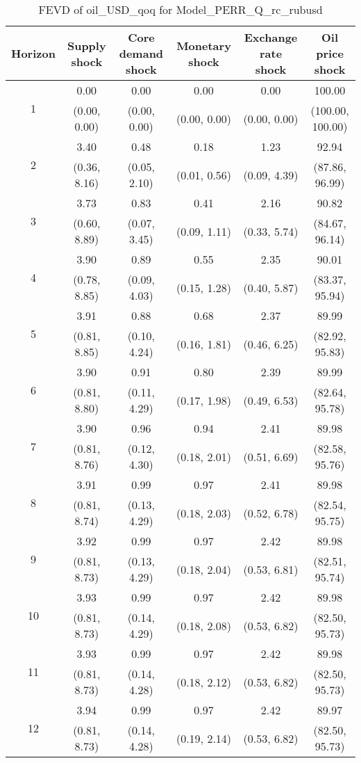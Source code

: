 \documentclass{article}
\begin{document}
\begin{table}
	\footnotesize
	\caption{FEVD of oil_USD_qoq for Model_PERR_Q_rc_rubusd}
	\begin{tabular}{cccccc}
		Horizon & Supply shock & Core demand shock & Monetary shock & Exchange rate shock & Oil price shock\\ \hline
		\multirow{2}{*}{1} & 0.00 & 0.00 & 0.00 & 0.00 & 100.00\\
		 & (0.00, 0.00) & (0.00, 0.00) & (0.00, 0.00) & (0.00, 0.00) & (100.00, 100.00)\\
		\multirow{2}{*}{2} & 3.40 & 0.48 & 0.18 & 1.23 & 92.94\\
		 & (0.36, 8.16) & (0.05, 2.10) & (0.01, 0.56) & (0.09, 4.39) & (87.86, 96.99)\\
		\multirow{2}{*}{3} & 3.73 & 0.83 & 0.41 & 2.16 & 90.82\\
		 & (0.60, 8.89) & (0.07, 3.45) & (0.09, 1.11) & (0.33, 5.74) & (84.67, 96.14)\\
		\multirow{2}{*}{4} & 3.90 & 0.89 & 0.55 & 2.35 & 90.01\\
		 & (0.78, 8.85) & (0.09, 4.03) & (0.15, 1.28) & (0.40, 5.87) & (83.37, 95.94)\\
		\multirow{2}{*}{5} & 3.91 & 0.88 & 0.68 & 2.37 & 89.99\\
		 & (0.81, 8.85) & (0.10, 4.24) & (0.16, 1.81) & (0.46, 6.25) & (82.92, 95.83)\\
		\multirow{2}{*}{6} & 3.90 & 0.91 & 0.80 & 2.39 & 89.99\\
		 & (0.81, 8.80) & (0.11, 4.29) & (0.17, 1.98) & (0.49, 6.53) & (82.64, 95.78)\\
		\multirow{2}{*}{7} & 3.90 & 0.96 & 0.94 & 2.41 & 89.98\\
		 & (0.81, 8.76) & (0.12, 4.30) & (0.18, 2.01) & (0.51, 6.69) & (82.58, 95.76)\\
		\multirow{2}{*}{8} & 3.91 & 0.99 & 0.97 & 2.41 & 89.98\\
		 & (0.81, 8.74) & (0.13, 4.29) & (0.18, 2.03) & (0.52, 6.78) & (82.54, 95.75)\\
		\multirow{2}{*}{9} & 3.92 & 0.99 & 0.97 & 2.42 & 89.98\\
		 & (0.81, 8.73) & (0.13, 4.29) & (0.18, 2.04) & (0.53, 6.81) & (82.51, 95.74)\\
		\multirow{2}{*}{10} & 3.93 & 0.99 & 0.97 & 2.42 & 89.98\\
		 & (0.81, 8.73) & (0.14, 4.29) & (0.18, 2.08) & (0.53, 6.82) & (82.50, 95.73)\\
		\multirow{2}{*}{11} & 3.93 & 0.99 & 0.97 & 2.42 & 89.98\\
		 & (0.81, 8.73) & (0.14, 4.28) & (0.18, 2.12) & (0.53, 6.82) & (82.50, 95.73)\\
		\multirow{2}{*}{12} & 3.94 & 0.99 & 0.97 & 2.42 & 89.97\\
		 & (0.81, 8.73) & (0.14, 4.28) & (0.19, 2.14) & (0.53, 6.82) & (82.50, 95.73)\\
	\end{tabular}
\label{tab:fevd-Model_PERR_Q_rc_rubusd-oil_USD_qoq}
\end{table}
\end{document}
